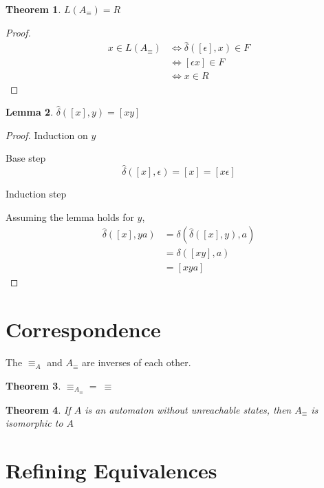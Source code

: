 \documentclass{report}
\newtheorem{theorem}{Theorem}[section]
\newtheorem{lemma}[theorem]{Lemma}
\newcommand{\dhat}{\hat{\delta}}
\begin{document}
\begin{theorem}
  $L(A_{\equiv}) = R$
\end{theorem}
\begin{proof}
  \begin{align*}
    x \in L(A_{\equiv}) & \iff \dhat([\epsilon],x) \in F \\
                        & \iff [\epsilon x] \in F        \\
                        & \iff x \in R
  \end{align*}
\end{proof}

\begin{lemma}
  $\dhat([x],y) = [xy]$
\end{lemma}
\begin{proof}
  Induction on $y$

  {\color{blue} Base step}
  $$
    \dhat([x],\epsilon) = [x] = [x\epsilon]
  $$

  {\color{blue} Induction step}
  \vspace{1mm}

  Assuming the lemma holds for $y$,
  \begin{align*}
    \dhat([x],ya) & = \delta(\dhat([x],y),a) \\
                  & = \delta([xy],a)         \\
                  & = [xya]
  \end{align*}
\end{proof}

\section{Correspondence}

The $\equiv_A$ and $A_{\equiv}$ are inverses of each other.

\begin{theorem}
  $\equiv_{A_\equiv} = \ \equiv$
\end{theorem}

\begin{theorem}
  If $A$ is an automaton without unreachable states, then $A_{\equiv}$ is isomorphic to $A$
\end{theorem}

\section{Refining Equivalences}
\end{document}
